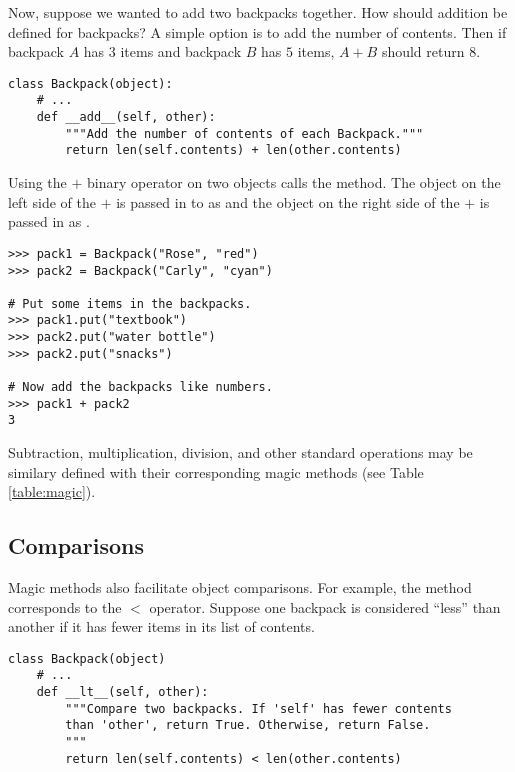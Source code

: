 Now, suppose we wanted to add two backpacks together.
How should addition be defined for backpacks?
A simple option is to add the number of contents.
Then if backpack $A$ has $3$ items and backpack $B$ has $5$ items, $A + B$ should return $8$.

\begin{lstlisting}
class Backpack(object):
    # ...
    def __add__(self, other):
        """Add the number of contents of each Backpack."""
        return len(self.contents) + len(other.contents)
\end{lstlisting}

Using the $+$ binary operator on two  objects calls the  method.
The object on the left side of the $+$ is passed in to  as  and the object on the right side of the $+$ is passed in as .

\begin{lstlisting}
>>> pack1 = Backpack("Rose", "red")
>>> pack2 = Backpack("Carly", "cyan")

# Put some items in the backpacks.
>>> pack1.put("textbook")
>>> pack2.put("water bottle")
>>> pack2.put("snacks")

# Now add the backpacks like numbers.
>>> pack1 + pack2
3
\end{lstlisting}

Subtraction, multiplication, division, and other standard operations may be similary defined with their corresponding magic methods (see Table \ref{table:magic}).

\subsection*{Comparisons} %

Magic methods also facilitate object comparisons.
For example, the  method corresponds to the $<$ operator.
Suppose one backpack is considered ``less'' than another if it has fewer items in its list of contents.

\begin{lstlisting}
class Backpack(object)
    # ...
    def __lt__(self, other):
        """Compare two backpacks. If 'self' has fewer contents
        than 'other', return True. Otherwise, return False.
        """
        return len(self.contents) < len(other.contents)
\end{lstlisting}

